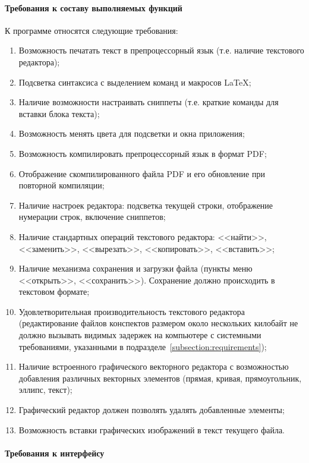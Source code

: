 \documentclass[techtask]{espd}
\begin{document}
\paragraph{Требования к составу выполняемых функций}
К программе относятся следующие требования:

\begin{enumerate}
\item Возможность печатать текст в препроцессорный язык (т.е. наличие текстового редактора);
\item Подсветка синтаксиса с выделением команд и макросов LaTeX;
\item Наличие возможности настраивать сниппеты (т.е. краткие команды для вставки блока текста);
\item Возможность менять цвета для подсветки и окна приложения;
\item Возможность компилировать препроцессорный язык в формат PDF;
\item Отображение скомпилированного файла PDF и его обновление при повторной компиляции;
\item Наличие настроек редактора: подсветка текущей строки, отображение нумерации строк, включение сниппетов;
\item Наличие стандартных операций текстового редактора: <<найти>>, <<заменить>>, <<вырезать>>, <<копировать>>, <<вставить>>;
\item Наличие механизма сохранения и загрузки файла (пункты меню <<открыть>>, <<сохранить>>). Сохранение должно происходить в текстовом формате;
\item Удовлетворительная производительность текстового редактора (редактирование файлов конспектов размером около нескольких килобайт не должно вызывать видимых задержек на компьютере с системными требованиями, указанными в подразделе~\ref{subsection:requirements});
\item Наличие встроенного графического векторного редактора с возможностью добавления различных векторных элементов (прямая, кривая, прямоугольник, эллипс, текст);
\item Графический редактор должен позволять удалять добавленные элементы;
\item Возможность вставки графических изображений в текст текущего файла.
\end{enumerate}

\paragraph{Требования к интерфейсу}
\end{document}
